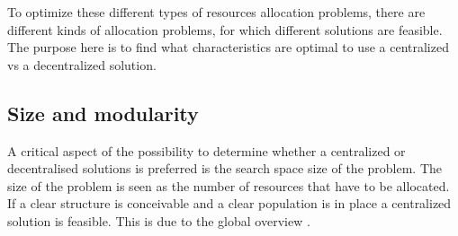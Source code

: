 To optimize these different types of resources allocation problems, there are different kinds of allocation problems, for which different solutions are feasible. The purpose here is to find what characteristics are optimal to use a centralized vs a decentralized solution.







\subsection{Size and modularity}
A  critical aspect of the possibility to determine whether a centralized or decentralised solutions is preferred is the search space size of the problem. The size of the problem is seen as the number of resources that have to be allocated.  If a clear structure is conceivable and a clear population is in place a centralized solution is feasible. This is due to the global overview . 


